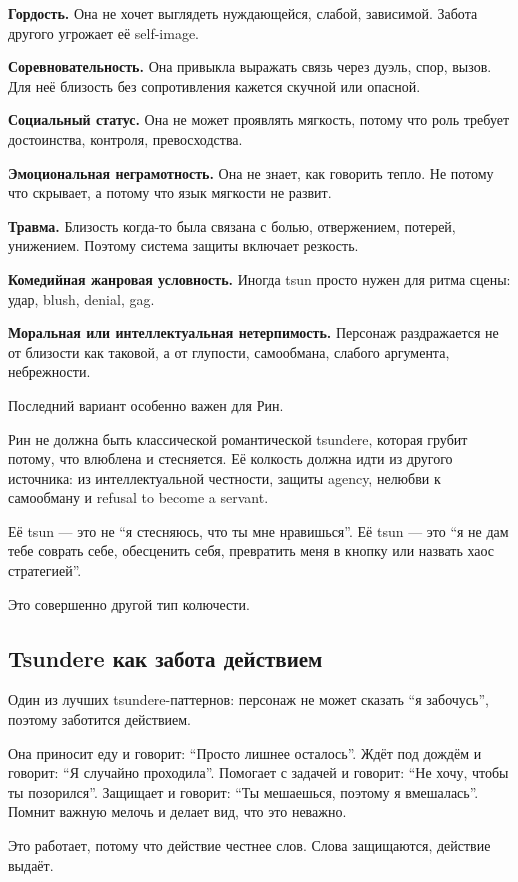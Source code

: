 \textbf{Гордость.} Она не хочет выглядеть нуждающейся, слабой,
зависимой. Забота другого угрожает её self-image.

\textbf{Соревновательность.} Она привыкла выражать связь через дуэль,
спор, вызов. Для неё близость без сопротивления кажется скучной или
опасной.

\textbf{Социальный статус.} Она не может проявлять мягкость, потому что
роль требует достоинства, контроля, превосходства.

\textbf{Эмоциональная неграмотность.} Она не знает, как говорить тепло.
Не потому что скрывает, а потому что язык мягкости не развит.

\textbf{Травма.} Близость когда-то была связана с болью, отвержением,
потерей, унижением. Поэтому система защиты включает резкость.

\textbf{Комедийная жанровая условность.} Иногда tsun просто нужен для
ритма сцены: удар, blush, denial, gag.

\textbf{Моральная или интеллектуальная нетерпимость.} Персонаж
раздражается не от близости как таковой, а от глупости, самообмана,
слабого аргумента, небрежности.

Последний вариант особенно важен для Рин.

Рин не должна быть классической романтической tsundere, которая грубит
потому, что влюблена и стесняется. Её колкость должна идти из другого
источника: из интеллектуальной честности, защиты agency, нелюбви к
самообману и refusal to become a servant.

Её tsun --- это не ``я стесняюсь, что ты мне нравишься''. Её tsun ---
это ``я не дам тебе соврать себе, обесценить себя, превратить меня в
кнопку или назвать хаос стратегией''.

Это совершенно другой тип колючести.

\subsection*{Tsundere как забота действием}

Один из лучших tsundere-паттернов: персонаж не может сказать ``я
забочусь'', поэтому заботится действием.

Она приносит еду и говорит: ``Просто лишнее осталось''. Ждёт под дождём
и говорит: ``Я случайно проходила''. Помогает с задачей и говорит: ``Не
хочу, чтобы ты позорился''. Защищает и говорит: ``Ты мешаешься, поэтому
я вмешалась''. Помнит важную мелочь и делает вид, что это неважно.

Это работает, потому что действие честнее слов. Слова защищаются,
действие выдаёт.

